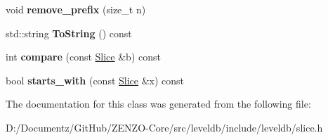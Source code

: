 \begin{DoxyCompactItemize}
void {\bfseries remove\+\_\+prefix} (size\+\_\+t n)
\item 
\mbox{\label{classleveldb_1_1_slice_a10ab05e2c2358bb6e6b6d49bf69d72ce}} 
std\+::string {\bfseries To\+String} () const
\item 
\mbox{\label{classleveldb_1_1_slice_a1ec69137e5cee9ef34c5c4fca3c62957}} 
int {\bfseries compare} (const \mbox{\hyperlink{classleveldb_1_1_slice}{Slice}} \&b) const
\item 
\mbox{\label{classleveldb_1_1_slice_ae1c0a7f51a18a83bbeebfb300bf23767}} 
bool {\bfseries starts\+\_\+with} (const \mbox{\hyperlink{classleveldb_1_1_slice}{Slice}} \&x) const
\end{DoxyCompactItemize}


The documentation for this class was generated from the following file\+:\begin{DoxyCompactItemize}
\item 
D\+:/\+Documentz/\+Git\+Hub/\+Z\+E\+N\+Z\+O-\/\+Core/src/leveldb/include/leveldb/slice.\+h\end{DoxyCompactItemize}
